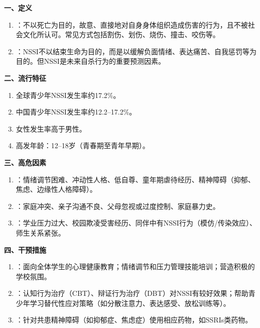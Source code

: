 \begin{keybox}
\textbf{一、定义}
\begin{enumerate}[leftmargin=*]
    \item {}：不以死亡为目的，故意、直接地对自身身体组织造成伤害的行为，且不被社会文化所认可。常见方式包括割伤、划伤、烧伤、撞击、咬伤等。
    \item {}：NSSI不以结束生命为目的，而是以缓解负面情绪、表达痛苦、自我惩罚等为目的。但NSSI是未来自杀行为的重要预测因素。
\end{enumerate}

\textbf{二、流行特征}
\begin{enumerate}[leftmargin=*]
    \item 全球青少年NSSI发生率约17.2\%。
    \item 中国青少年NSSI发生率约12.2--17.2\%。
    \item 女性发生率高于男性。
    \item 高发年龄：12--18岁（青春期至青年早期）。
\end{enumerate}

\textbf{三、高危因素}
\begin{enumerate}[leftmargin=*]
    \item {}：情绪调节困难、冲动性人格、低自尊、童年期虐待经历、精神障碍（抑郁、焦虑、边缘性人格障碍）。
    \item {}：家庭冲突、亲子沟通不良、父母忽视或过度控制、家庭暴力史。
    \item {}：学业压力过大、校园欺凌受害经历、同伴中有NSSI行为（模仿/传染效应）、师生关系紧张。
\end{enumerate}

\textbf{四、干预措施}
\begin{enumerate}[leftmargin=*]
    \item {}：面向全体学生的心理健康教育；情绪调节和压力管理技能培训；营造积极的学校氛围。
    \item {}：认知行为治疗（CBT）、辩证行为治疗（DBT）对NSSI有较好效果；帮助青少年学习替代性应对策略（如分散注意力、表达感受、放松训练等）。
    \item {}：针对共患精神障碍（如抑郁症、焦虑症）使用相应药物，如SSRIs类药物。
\end{enumerate}
\end{keybox}

